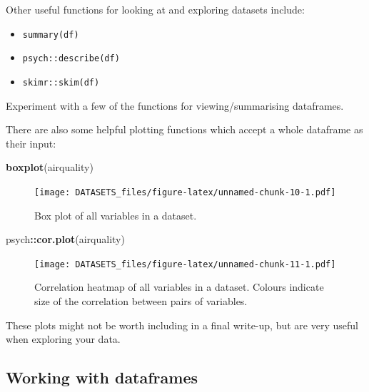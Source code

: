 \documentclass[]{article}
\newenvironment{Shaded}{\begin{snugshade}}{\end{snugshade}}
\newcommand{\KeywordTok}[1]{\textcolor[rgb]{0.13,0.29,0.53}{\textbf{#1}}}
\newcommand{\NormalTok}[1]{#1}
\newcommand{\OperatorTok}[1]{\textcolor[rgb]{0.81,0.36,0.00}{\textbf{#1}}}
\providecommand{\tightlist}{%
  \setlength{\itemsep}{0pt}\setlength{\parskip}{0pt}}
\begin{document}
Other useful functions for looking at and exploring datasets include:

\begin{itemize}
\tightlist
\item
  \texttt{summary(df)}
\item
  \texttt{psych::describe(df)}
\item
  \texttt{skimr::skim(df)}
\end{itemize}

Experiment with a few of the functions for viewing/summarising dataframes.

There are also some helpful plotting functions which accept a whole dataframe as
their input:

\begin{Shaded}
\begin{Highlighting}[]
\KeywordTok{boxplot}\NormalTok{(airquality)}
\end{Highlighting}
\end{Shaded}

\begin{figure}
\centering
\texttt{[image: DATASETS\_files/figure-latex/unnamed-chunk-10-1.pdf]}
\caption{\label{fig:unnamed-chunk-10}Box plot of all variables in a dataset.}
\end{figure}

\begin{Shaded}
\begin{Highlighting}[]
\NormalTok{psych}\OperatorTok{::}\KeywordTok{cor.plot}\NormalTok{(airquality)}
\end{Highlighting}
\end{Shaded}

\begin{figure}
\centering
\texttt{[image: DATASETS\_files/figure-latex/unnamed-chunk-11-1.pdf]}
\caption{\label{fig:unnamed-chunk-11}Correlation heatmap of all variables in a dataset. Colours indicate size of the correlation between pairs of variables.}
\end{figure}

These plots might not be worth including in a final write-up, but are very
useful when exploring your data.

\hypertarget{working-with-dataframes}{%
\subsection*{Working with dataframes}\label{working-with-dataframes}}
\end{document}
